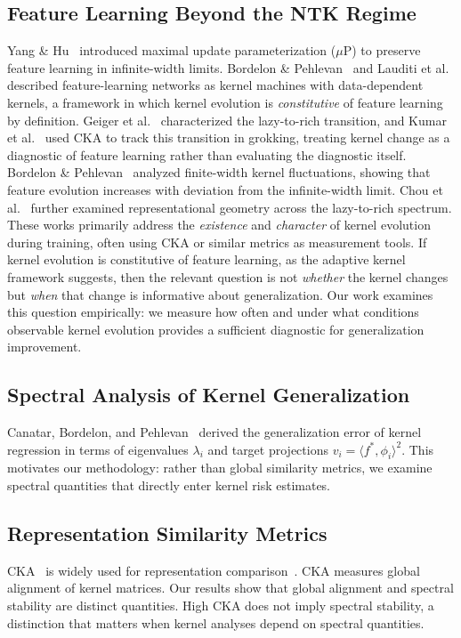 \documentclass[10pt]{article}
\begin{document}
\subsection{Feature Learning Beyond the NTK Regime}
Yang \& Hu~\cite{yang2021tensor} introduced maximal update parameterization ($\mu$P) to preserve feature learning in infinite-width limits.  Bordelon \& Pehlevan~\cite{bordelon2022spectral} and Lauditi et al.~\cite{lauditi2025adaptive} described feature-learning networks as kernel machines with data-dependent kernels, a framework in which kernel evolution is \emph{constitutive} of feature learning by definition.  Geiger et al.~\cite{geiger2020scaling} characterized the lazy-to-rich transition, and Kumar et al.~\cite{kumar2024grokking} used CKA to track this transition in grokking, treating kernel change as a diagnostic of feature learning rather than evaluating the diagnostic itself.  Bordelon \& Pehlevan~\cite{bordelon2023dynamics} analyzed finite-width kernel fluctuations, showing that feature evolution increases with deviation from the infinite-width limit.  Chou et al.~\cite{chou2025feature} further examined representational geometry across the lazy-to-rich spectrum.  These works primarily address the \emph{existence} and \emph{character} of kernel evolution during training, often using CKA or similar metrics as measurement tools.  If kernel evolution is constitutive of feature learning, as the adaptive kernel framework suggests, then the relevant question is not \emph{whether} the kernel changes but \emph{when} that change is informative about generalization.  Our work examines this question empirically: we measure how often and under what conditions observable kernel evolution provides a sufficient diagnostic for generalization improvement.

\subsection{Spectral Analysis of Kernel Generalization}
Canatar, Bordelon, and Pehlevan~\cite{canatar2021spectral} derived the generalization error of kernel regression in terms of eigenvalues $\lambda_{i}$ and target projections $v_{i}=\langle f^{*},\phi_{i}\rangle^{2}$.  This motivates our methodology: rather than global similarity metrics, we examine spectral quantities that directly enter kernel risk estimates.

\subsection{Representation Similarity Metrics}
CKA~\citep{kornblith2019similarity} is widely used for representation comparison~\citep{raghu2017svcca,morcos2018insights,klabunde2023similarity}.  CKA measures global alignment of kernel matrices.  Our results show that global alignment and spectral stability are distinct quantities.  High CKA does not imply spectral stability, a distinction that matters when kernel analyses depend on spectral quantities.
\end{document}
